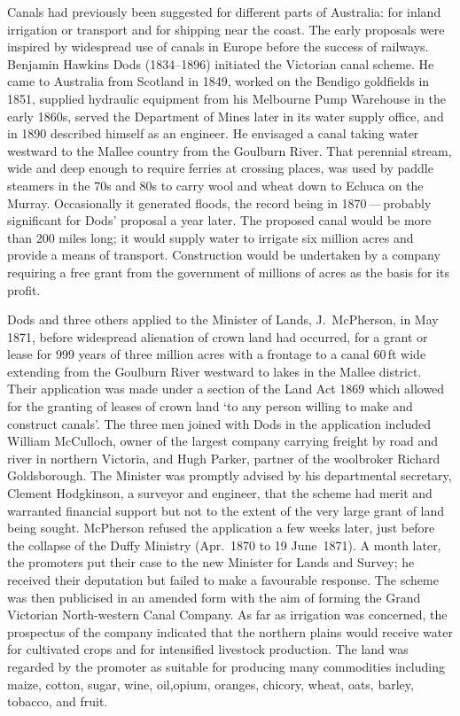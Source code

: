 Canals had previously been suggested for different parts of Australia:
for inland irrigation or transport and for shipping near the coast.
The early proposals were inspired by widespread use of canals in
Europe before the success of railways.  Benjamin Hawkins Dods
(1834--1896) initiated the Victorian canal scheme.  He came to
Australia from Scotland in 1849, worked on the Bendigo goldfields in
1851, supplied hydraulic equipment from his Melbourne Pump Warehouse
in the early 1860s, served the Department of Mines later in its water
supply office, and in 1890 described himself as an engineer.  He
envisaged a canal taking water westward to the Mallee country from the
Goulburn River. That perennial stream, wide and deep enough to require
ferries at crossing places, was used by paddle steamers in the 70s and
80s to carry wool and wheat down to Echuca on the Murray.
Occasionally it generated floods, the record being in 1870\,---\,probably
significant for Dods' proposal a year later.  The proposed canal would
be more than 200 miles long; it would supply water to irrigate six
million acres and provide a means of transport.  Construction would be
undertaken by a company requiring a free grant from the government of
millions of acres as the basis for its
profit.

Dods and three others applied to the Minister of Lands, J.~McPherson,
in May 1871, before widespread alienation of crown land had occurred,
for a grant or lease for 999 years of three million acres with a
frontage to a canal 60\,ft wide extending from the Goulburn River
westward to lakes in the Mallee district.  Their application was made
under a section of the Land Act 1869 which allowed for the granting of
leases of crown land `to any person willing to make and construct
canals'.  The three men joined with Dods in the application included
William McCulloch, owner of the largest company carrying freight by
road and river in northern Victoria, and Hugh Parker, partner of the
woolbroker Richard Goldsborough.  The Minister was promptly advised by
his departmental secretary, Clement Hodgkinson, a surveyor and
engineer, that the scheme had merit and warranted financial support
but not to the extent of the very large grant of land being sought.
McPherson refused the application a few weeks later, just before the
collapse of the Duffy Ministry (Apr.\ 1870 to 19 June~1871).  A month
later, the promoters put their case to the new Minister for Lands and
Survey; he received their deputation but failed to make a favourable
response.  The scheme was then publicised in an amended form with the
aim of forming the Grand Victorian North-western Canal Company.  As
far as irrigation was concerned, the prospectus of the company
indicated that the northern plains would receive water for cultivated
crops and for intensified livestock production.  The land was regarded
by the promoter as suitable for producing many commodities including
maize, cotton, sugar, wine, oil,opium, oranges, chicory, wheat, oats,
barley, tobacco, and fruit.

